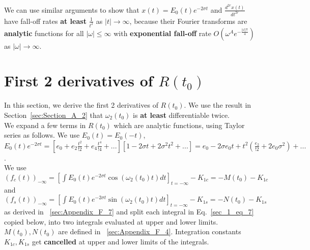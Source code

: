 \documentclass[11pt]{elsarticle}
\begin{document}
We can use similar arguments to show that $x(t)=E_0(t) e^{-2 \sigma t}$ and $\frac{d^{2r}x(t)}{dt^{2r}}$  have fall-off rates \textbf{at least} $\frac{1}{t^2}$ as $|t| \to \infty$, because their Fourier transforms are \textbf{analytic} functions for all $|\omega| \leq \infty$ with  \textbf{exponential fall-off} rate $O( \omega^A e^{-\frac{|\omega|\pi}{4}})$ as $|\omega| \to \infty$. %
















\clearpage
\section{\label{sec:appendix_F}  First 2 derivatives of $R(t_0)$ \protect\\  \lowercase{} }

In this section, we derive the first 2 derivatives of $R(t_0)$. We use the result in Section~\ref{sec:Section_A_2} that $\omega_2(t_0)$ is \textbf{at least} differentiable twice. \\



We expand a few terms in $R(t_0)$  which are analytic functions, using Taylor series as follows. We use $E_{0}(t)=E_{0}(-t)$, $E_0(t) e^{-2 \sigma t} = [e_0 + e_2 \frac{t^{2}}{!2} + e_4 \frac{t^{4}}{!4} + ... ] [  1 -  2 \sigma t +  2\sigma^{2} t^{2}+...] = e_0  -  2 \sigma e_0 t + t^{2}  (\frac{e_2}{!2} +  2 e_0 \sigma^{2}) + ... $.\\

We use  $(f_{c}(t))_{-\infty} = [\int    E_0(t) e^{-2 \sigma t}  \cos{ ( \omega_2(t_0) t)} dt ]_{t=-\infty} -K_{1c} = - M(t_0) -K_{1c}$ and \\$(f_{s}(t))_{-\infty} =  [\int    E_0(t) e^{-2 \sigma t}  \sin{ ( \omega_2(t_0) t)} dt ]_{t=-\infty}  -K_{1s}  = -N(t_0)  -K_{1s}$ as derived in ~\ref{sec:Appendix_F_7}  and split each integral in Eq.~\ref{sec_1_eq_7} copied below, into two integrals evaluated at upper and lower limits. $M(t_0), N(t_0)$ are defined in ~\ref{sec:Appendix_F_4}. Integration constants $K_{1c},K_{1s}$ get \textbf{cancelled} at upper and lower limits of the integrals.%
\end{document}
